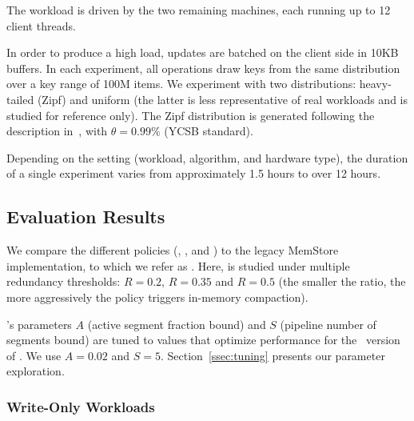 The workload is driven by the two remaining machines, each running up to 12 client threads. 

In order to produce a high load, updates are batched on the client side in 10KB buffers. 
In each experiment, all operations draw keys from the same distribution over a key range
of 100M items. We experiment with two distributions: heavy-tailed (Zipf) and uniform (the latter 
is less representative of real workloads and is studied for reference only). The Zipf distribution 
is generated following the description in~\cite{Gray:1994:QGB:191839.191886}, with $\theta=0.99\%$ 
(YCSB standard).

Depending on the setting (workload, algorithm, and hardware type), 
the duration of 
a single experiment  varies from approximately 1.5 hours to over 12 hours.  

\subsection{Evaluation Results}
\label{ssec:results}

We compare the different \sys\/ policies (\basic, \adp, and \eager) to the legacy MemStore implementation, to which we refer as 
\none. Here, \adp\/ is studied under multiple 
redundancy thresholds: $R=0.2$, $R=0.35$ and $R=0.5$ (the smaller the ratio, the more aggressively
the policy triggers in-memory compaction).  

\sys's parameters  $A$ (active segment fraction bound) and $S$ (pipeline number of segments bound)  
are tuned to values that optimize performance for the \basic\ version of \sys. We use $A=0.02$ and $S=5$.
Section~\ref{ssec:tuning} presents our parameter exploration. 


\subsubsection{Write-Only Workloads}

